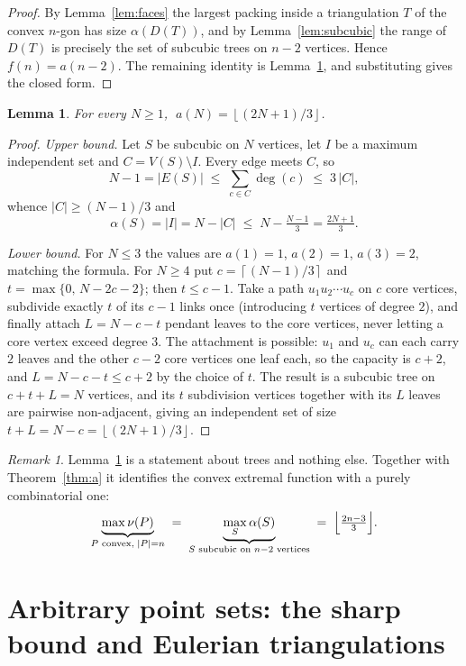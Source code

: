 \documentclass[11pt]{article}
\theoremstyle{plain}
\newtheorem{lemma}[theorem]{Lemma}
\theoremstyle{definition}
\theoremstyle{remark}
\newtheorem{remark}[theorem]{Remark}
\newcommand{\Floor}[1]{\left\lfloor #1\right\rfloor}
\newcommand{\Ceil}[1]{\left\lceil #1\right\rceil}
\begin{document}
\begin{proof}
By Lemma~\ref{lem:faces} the largest packing inside a triangulation $T$ of the convex
$n$-gon has size $\alpha(D(T))$, and by Lemma~\ref{lem:subcubic} the range of $D(T)$ is
precisely the set of subcubic trees on $n-2$ vertices.  Hence $f(n)=a(n-2)$.  The
remaining identity is Lemma~\ref{lem:a}, and substituting gives the closed form.
\end{proof}

\begin{lemma}\label{lem:a}
For every $N\ge 1$, $\;a(N)=\Floor{(2N+1)/3}$.
\end{lemma}

\begin{proof}
\emph{Upper bound.} Let $S$ be subcubic on $N$ vertices, let $I$ be a maximum independent
set and $C=V(S)\setminus I$.  Every edge meets $C$, so
\[
N-1=|E(S)|\;\le\;\sum_{c\in C}\deg(c)\;\le\;3\,|C|,
\]
whence $|C|\ge (N-1)/3$ and
\[
\alpha(S)=|I|=N-|C|\;\le\;N-\tfrac{N-1}{3}=\tfrac{2N+1}{3}.
\]

\emph{Lower bound.} For $N\le 3$ the values are $a(1)=1$, $a(2)=1$, $a(3)=2$, matching the
formula.  For $N\ge 4$ put $c=\Ceil{(N-1)/3}$ and $t=\max\{0,\,N-2c-2\}$; then $t\le c-1$.
Take a path $u_1u_2\cdots u_c$ on $c$ core vertices, subdivide exactly $t$ of its $c-1$
links once (introducing $t$ vertices of degree $2$), and finally attach
$L=N-c-t$ pendant leaves to the core vertices, never letting a core vertex exceed degree
$3$.  The attachment is possible: $u_1$ and $u_c$ can each carry $2$ leaves and the other
$c-2$ core vertices one leaf each, so the capacity is $c+2$, and $L=N-c-t\le c+2$ by the
choice of $t$.  The result is a subcubic tree on $c+t+L=N$ vertices, and its $t$
subdivision vertices together with its $L$ leaves are pairwise non-adjacent, giving an
independent set of size $t+L=N-c=\Floor{(2N+1)/3}$.
\end{proof}

\begin{remark}\label{rem:identity}
Lemma~\ref{lem:a} is a statement about trees and nothing else.  Together with
Theorem~\ref{thm:a} it identifies the convex extremal function with a purely combinatorial
one:
\[
\underbrace{\max\nu(P)}_{P\text{ convex},\;|P|=n}
\;=\;
\underbrace{\max_S\alpha(S)}_{S\text{ subcubic on }n-2\text{ vertices}}
\;=\;\Bigl\lfloor\tfrac{2n-3}{3}\Bigr\rfloor .
\]
\end{remark}

\section{Arbitrary point sets: the sharp bound and Eulerian triangulations}
\end{document}

